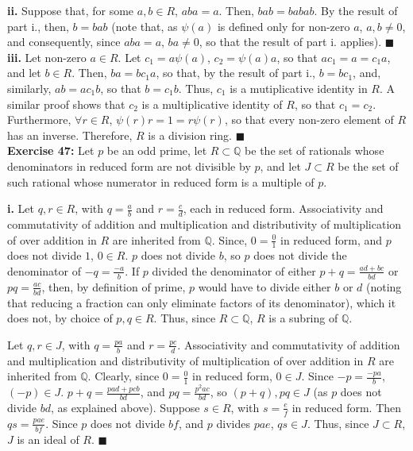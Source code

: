 \documentclass{article}%
\begin{document}
\textbf{ii.} Suppose that, for some $a,b \in R$, $aba = a$. Then, $bab =
babab$. By the result of part i., then, $b = bab$ (note that, as $\psi(a)$ is
defined only for non-zero $a$, $a, b \neq 0$, and consequently, since
$aba = a$, $ba \neq 0$, so that the result of part i. applies).
\qquad $\blacksquare$ \\

\textbf{iii.} Let non-zero $a \in R$. Let $c_1 = a\psi(a)$, $c_2 = \psi(a)a$,
so that $ac_1 = a = c_1a$, and let $b \in R$. Then, $ba = bc_1a$, so that, by
the result of part i., $b = bc_1$, and, similarly, $ab = ac_1b$, so that
$b = c_1b$. Thus, $c_1$ is a mutiplicative identity in $R$. A similar proof
shows that $c_2$ is a multiplicative identity of $R$, so that $c_1 = c_2$.
Furthermore, $\forall r \in R$, $\psi(r)r = 1 = r\psi(r)$, so that every
non-zero element of $R$ has an inverse. Therefore, $R$ is a division ring.
\qquad $\blacksquare$ \\

\textbf{Exercise 47:} Let $p$ be an odd prime, let $R \subset \mathbb{Q}$ be
the set of rationals whose denominators in reduced form are not divisible by
$p$, and let $J \subset R$ be the set of such rational whose numerator in
reduced form is a multiple of $p$.

\textbf{i.} Let $q, r \in R$, with $q = \frac{a}{b}$ and $r = \frac{c}{d}$,
each in reduced form. Associativity and commutativity of addition and
multiplication and distributivity of multiplication of over addition in $R$
are inherited from $\mathbb{Q}$. Since, $0 = \frac{0}{1}$ in reduced form, and
$p$ does not divide $1$, $0 \in R$. $p$ does not divide $b$, so $p$ does not
divide the denominator of $-q = \frac{-a}{b}$. If $p$ divided the
denominator of either $p + q = \frac{ad + bc}{bd}$ or $pq = \frac{ac}{bd}$,
then, by definition of prime, $p$ would have to divide either $b$ or $d$
(noting that reducing a fraction can only eliminate factors of its
denominator), which it does not, by choice of $p, q \in R$. Thus, since
$R \subset \mathbb{Q}$, $R$ is a subring of $\mathbb{Q}$.

Let $q, r \in J$, with $q = \frac{pa}{b}$ and $r = \frac{pc}{d}$.
Associativity and commutativity of addition and multiplication and
distributivity of multiplication of over addition in $R$ are inherited from
$\mathbb{Q}$. Clearly, since $0 = \frac{0}{1}$ in reduced form, $0 \in J$.
Since $-p = \frac{-pa}{b}$, $(-p) \in J$. $p + q = \frac{pad + pcb}{bd}$, and
$pq = \frac{p^2ac}{bd}$, so $(p + q), pq \in J$ (as $p$ does not divide $bd$,
as explained above). Suppose $s \in R$, with $s = \frac{e}{f}$ in reduced form.
Then $qs = \frac{pae}{bf}$. Since $p$ does not divide $bf$, and $p$ divides
$pae$, $qs \in J$. Thus, since $J \subset R$, $J$ is an ideal of $R$.
\qquad $\blacksquare$ \\
\end{document}
